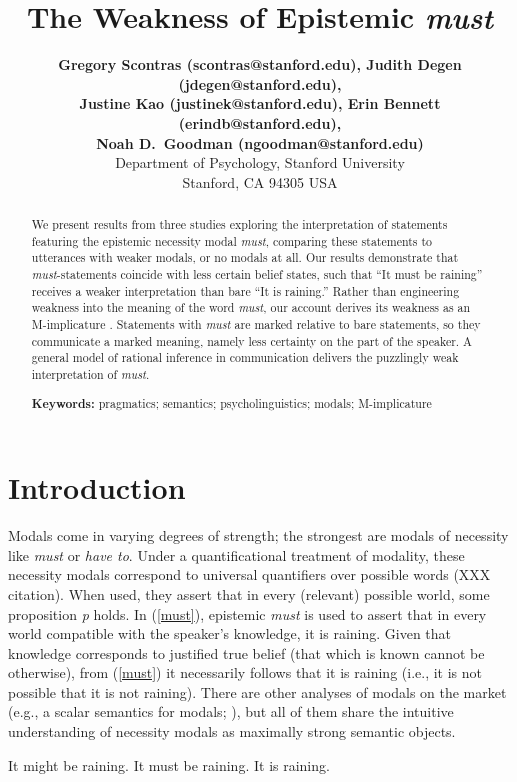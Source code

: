 \documentclass[10pt,letterpaper]{article}
\title{The Weakness of Epistemic \emph{must}}
\author{{\large \bf Gregory Scontras (scontras@stanford.edu), Judith Degen (jdegen@stanford.edu),}\\ {\large \bf Justine Kao (justinek@stanford.edu), Erin Bennett (erindb@stanford.edu),}\\ {\large \bf Noah D.~Goodman (ngoodman@stanford.edu)} \\
  Department of Psychology, Stanford University\\
  Stanford, CA 94305 USA}
\begin{document}
\maketitle


\begin{abstract}
We present results from three studies exploring the interpretation of statements featuring the epistemic necessity modal \emph{must}, comparing these statements to utterances with weaker modals, or no modals at all. Our results demonstrate that \emph{must}-statements coincide with less certain belief states, such that ``It must be raining'' receives a weaker interpretation than bare ``It is raining.'' Rather than engineering weakness into the meaning of the word \emph{must}, our account derives its weakness as an M-implicature \cite{levinson2000}. Statements with \emph{must} are marked relative to bare statements, so they communicate a marked meaning, namely less certainty on the part of the speaker. A general model of rational inference in communication delivers the puzzlingly weak interpretation of \emph{must}.
	
\textbf{Keywords:} 
pragmatics; semantics; psycholinguistics; modals; M-implicature 
\end{abstract}


\section{Introduction}

Modals come in varying degrees of strength; the strongest are modals of necessity like \emph{must} or \emph{have to}. Under a quantificational treatment of modality, these necessity modals correspond to universal quantifiers over possible words (XXX citation). When used, they assert that in every (relevant) possible world, some proposition \emph{p} holds. In (\ref{must}), epistemic \emph{must} is used to assert that in every world compatible with the speaker's knowledge, it is raining. Given that knowledge corresponds to justified true belief (that which is known cannot be otherwise), from (\ref{must}) it necessarily follows that it is raining (i.e., it is not possible that it is not raining). There are other analyses of modals on the market (e.g., a scalar semantics for modals; ), but all of them share the intuitive understanding of necessity modals as maximally strong semantic objects. 

\begin{exe}
	\ex\label{inference} \begin{xlist}
		\ex\label{might} It might be raining.
		\ex\label{must} It must be raining. 
		\ex\label{bare} It is raining.
	\end{xlist}
\end{exe}
\end{document}
